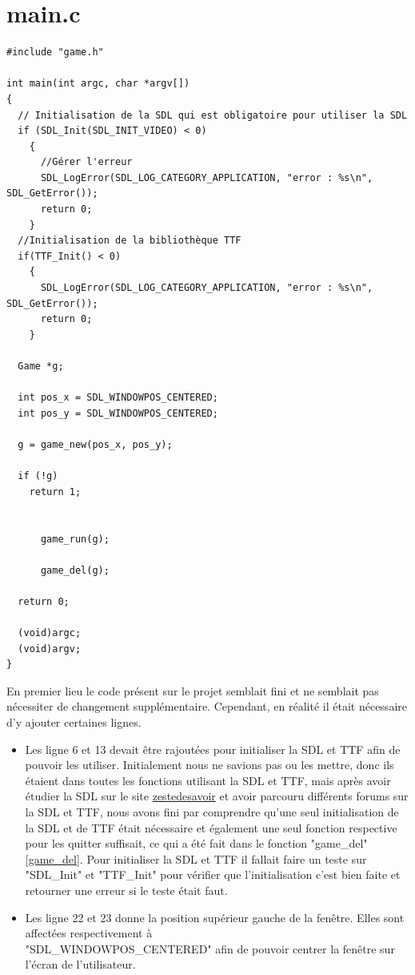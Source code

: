 \documentclass[a4paper,10p]{report}
\begin{document}
\chapter{main.c}
\label{main.c}
\begin{lstlisting}
#include "game.h"

int main(int argc, char *argv[])
{
  // Initialisation de la SDL qui est obligatoire pour utiliser la SDL
  if (SDL_Init(SDL_INIT_VIDEO) < 0)
    {
      //Gérer l'erreur
      SDL_LogError(SDL_LOG_CATEGORY_APPLICATION, "error : %s\n", SDL_GetError());
      return 0;
    }
  //Initialisation de la bibliothèque TTF
  if(TTF_Init() < 0)
    {
      SDL_LogError(SDL_LOG_CATEGORY_APPLICATION, "error : %s\n", SDL_GetError());
      return 0;
    }
    
  Game *g;

  int pos_x = SDL_WINDOWPOS_CENTERED;
  int pos_y = SDL_WINDOWPOS_CENTERED;
  
  g = game_new(pos_x, pos_y);
  
  if (!g)
    return 1;


      game_run(g);
  
      game_del(g);

  return 0;

  (void)argc;
  (void)argv;
}

\end{lstlisting}
En premier lieu le code présent sur le projet semblait fini et ne semblait pas nécessiter de changement supplémentaire. Cependant, en réalité il était nécessaire d'y ajouter certaines lignes. 
\begin{itemize}

    \item Les ligne \textcolor{gris}{6} et \textcolor{gris}{13} devait être rajoutées pour initialiser la SDL et TTF afin de pouvoir les utiliser. Initialement nous ne savions pas ou les mettre, donc ils étaient dans toutes les fonctions utilisant la SDL et TTF, mais après avoir étudier la SDL sur le site \href{https://zestedesavoir.com/tutoriels/1014/utiliser-la-sdl-en-langage-c/}{zestedesavoir} et avoir parcouru différents forums sur la SDL et TTF, nous avons fini par comprendre qu'une seul initialisation de la SDL et de TTF était nécessaire et également une seul fonction respective pour les quitter suffisait, ce qui a été fait dans le fonction "game\_del" \ref{game_del}. Pour initialiser la SDL et TTF il fallait faire un teste sur "SDL\_Init" et "TTF\_Init" pour vérifier que l'initialisation c'est bien faite et retourner une erreur si le teste était faut.
    \item Les ligne \textcolor{gris}{22} et \textcolor{gris}{23} donne la position supérieur gauche de la fenêtre. Elles sont affectées respectivement à
    \\"SDL\_WINDOWPOS\_CENTERED" afin de pouvoir centrer la fenêtre sur l'écran de l'utilisateur.
\end{itemize}
\end{document}
